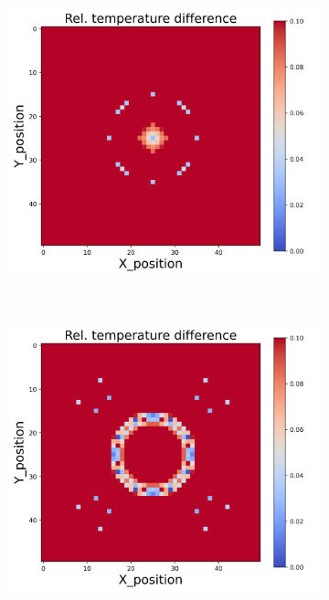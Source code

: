 \begin{figure}[h]
\begin{minipage}{\textwidth}
\begin{subfigure}{0.3\textwidth}
        \end{subfigure}
        \begin{subfigure}{0.3\textwidth}
            \centering
            \includegraphics[width=\textwidth]{figures/raw_data/31/exp/T_bias.jpg}
        \end{subfigure}
    \end{minipage}\\
    \begin{minipage}{\textwidth}
        \centering
        \begin{subfigure}{0.3\textwidth}
            \centering
            \includegraphics[width=\textwidth]{figures/raw_data/32/exp/T_bias.jpg}

\end{subfigure}
\end{minipage}
\end{figure}
